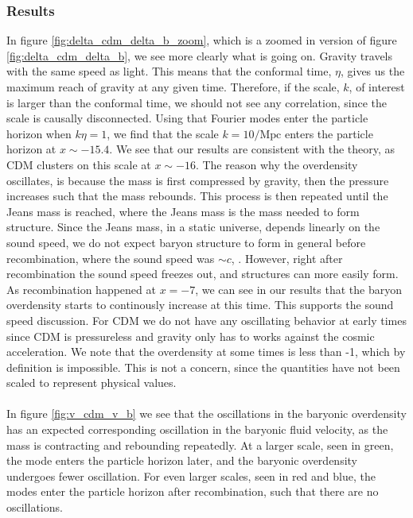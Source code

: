 \documentclass{aa}
\begin{document}
\subsubsection{Results}
In figure \ref{fig:delta_cdm_delta_b_zoom}, which is a zoomed in version of figure \ref{fig:delta_cdm_delta_b}, we see more clearly what is going on. Gravity travels with the same speed as light. This means that the conformal time, $\eta$,
gives us the maximum reach of gravity at any given time. Therefore, if the scale, $k$, of interest is larger than the conformal time, we should not see any correlation,
since the scale is causally disconnected. Using that Fourier modes enter the particle horizon when $k\eta=1$, we find
that the scale $k=10/\mathrm{Mpc}$ enters the particle horizon at $x\sim -15.4$.
We see that our results are consistent with the theory, as CDM clusters on this scale at $x\sim -16$. The reason why the overdensity oscillates, is because 
the mass is first compressed by gravity, then the pressure increases such that the mass rebounds. This process is then repeated until the Jeans mass is reached, where the Jeans mass is the mass needed to form structure.
Since the Jeans mass, in a static universe, depends linearly on the sound speed, we do not expect baryon structure to form in general before recombination, where the sound speed was $\sim c$, \cite{Shen:2022}. However, right after recombination  
the sound speed freezes out, and structures can more easily form. As recombination happened at $x=-7$, we can see in our results that the baryon overdensity starts to continously increase at this time. This supports the sound speed discussion.
For CDM we do not have any oscillating behavior at early times since CDM is pressureless and gravity only has to works against the cosmic acceleration.   
We note that the overdensity at some times is less than -1, which by definition is impossible. This is not a concern, since the quantities have not been scaled to represent physical values. 
\\ \\
In figure \ref{fig:v_cdm_v_b} we see that the oscillations in the baryonic overdensity has an expected corresponding oscillation in the baryonic fluid velocity, as the mass is contracting and rebounding repeatedly.
At a larger scale, seen in green, the mode enters the particle horizon later, and the baryonic overdensity undergoes fewer oscillation. For even larger scales, seen in 
red and blue, the modes enter the particle horizon after recombination, such that there are no oscillations.
\end{document}
